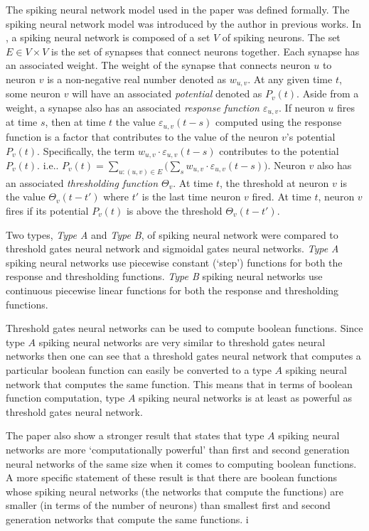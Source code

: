 \documentclass[12pt,A4]{article}
\begin{document}
The spiking neural network model used in the paper was defined formally. The spiking neural network
model was introduced by the author in previous works. In \cite{maass-1997-third}, a spiking neural
network is composed of a set $V$ of spiking neurons. The set $E \in V \times V$ is the set of 
synapses that connect neurons together. Each synapse has an associated weight. The weight of the
synapse that connects neuron $u$ to neuron $v$ is a non-negative real number denoted as $w_{u,v}$.
At any given time $t$, some neuron $v$ will have an associated \emph{potential} denoted as $P_v(t)$.
Aside from a weight, a synapse also has an associated \emph{response function $\varepsilon_{u,v}$}.
If neuron $u$ fires at time $s$, then at time $t$ the value $\varepsilon_{u,v}(t-s)$ computed using
the response function is a factor that contributes to the value of the neuron $v$'s potential 
$P_v(t)$. Specifically, the term $w_{u,v} \cdot \varepsilon_{u,v}(t-s)$ contributes to the potential
$P_v(t)$. i.e.. $P_v(t) = \sum_{u:(u,v)\in E}\Big(\sum_{s} w_{u,v}\cdot \varepsilon_{u,v}(t-s)\Big)$. 
Neuron $v$ also has an associated \emph{thresholding function $\Theta_v$}. At time $t$, the
threshold at neuron $v$ is the value $\Theta_v(t-t')$ where $t'$ is the last time neuron $v$ fired.
At time $t$, neuron $v$ fires if its potential $P_v(t)$ is above the threshold $\Theta_v(t-t')$.

Two types, \emph{Type A} and \emph{Type B}, of spiking neural network were compared to threshold 
gates neural network and sigmoidal gates neural networks. \emph{Type A} spiking neural networks use
piecewise constant (`step') functions for both the response and thresholding functions. 
\emph{Type B} spiking neural networks use continuous piecewise linear functions for both the
response and thresholding functions.

Threshold gates neural networks can be used to compute boolean functions. Since type $A$ spiking
neural networks are very similar to threshold gates neural networks then one can see that
a threshold gates neural network that computes a particular boolean function can easily be converted 
to a type $A$ spiking neural network that computes the same function. This means that in terms of
boolean function computation, type $A$ spiking neural networks is at least as powerful as threshold
gates neural network.

The paper also show a stronger result that states that type $A$ spiking neural networks are more
`computationally powerful' than first and second generation neural networks of the same size when it
comes to computing boolean functions. A more specific statement of these result is that there are
boolean functions whose spiking neural networks (the networks that compute the functions) are 
smaller (in terms of the number of neurons) than smallest first and second generation networks that
compute the same functions. i
\end{document}
